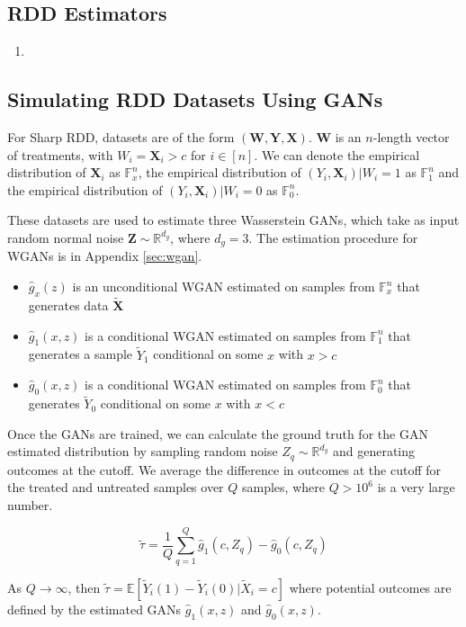 \documentclass[12pt]{article}
\theoremstyle{definition}
\begin{document}
\subsection{RDD Estimators} 



\begin{enumerate} 
\item 
\end{enumerate} 

\subsection{Simulating RDD Datasets Using GANs} 

For Sharp RDD, datasets are of the form $(\bm W, \bm Y, \bm X)$. $\bm W$ is an $n$-length vector of treatments, with $W_i = \bm X_i > c$ for $i \in [n]$. We can denote the empirical distribution of $\bm X_i$ as $\mathbb F^n_x$, the empirical distribution of $(Y_i, \bm X_i )| W_i = 1$ as $\mathbb F^n_{1}$ and the empirical distribution of $(Y_i, \bm X_i) | W_i = 0$ as $\mathbb F^n_{0}$.  

These datasets are used to estimate three Wasserstein GANs, which take as input random normal noise $\bm Z \sim \mathbb R^{d_g}$, where $d_g = 3$. The estimation procedure for WGANs is in Appendix \ref{sec:wgan}. 
\begin{itemize} 
\item $\hat g_x(z)$ is an unconditional WGAN estimated on samples from $\mathbb F^n_x$ that generates data $\tilde {\bm X}$
\item $\hat g_1(x, z)$ is a conditional WGAN estimated on samples from $ \mathbb F^n_{1}$  that generates a sample ${\tilde Y_1}$ conditional on some $x$ with $x>c$ 
\item $\hat g_0(x, z)$ is a conditional WGAN estimated on samples from $\mathbb F^n_{0}$  that generates ${\tilde Y_0}$ conditional on some $x$ with $x< c$ \end{itemize} 

Once the GANs are trained, we can calculate the ground truth for the GAN estimated distribution by sampling random noise $Z_q \sim \mathbb R^{d_g}$ and generating outcomes at the cutoff. We average the difference in outcomes at the cutoff for the treated and untreated samples over $Q$ samples, where $Q > 10^6$ is a very large number. 

\[ \tilde \tau = \frac 1Q\sum \limits_{q=1}^Q \hat g_1(c, Z_q) - \hat g_0(c, Z_q)\]  

As $Q \rightarrow \infty$, then $\tilde \tau = \mathbb E[\tilde Y_i(1) - \tilde Y_i(0) | \tilde X_i = c]$ where potential outcomes are defined by the estimated GANs $\hat g_1(x, z)$ and $\hat g_0(x, z)$.   
\end{document}
